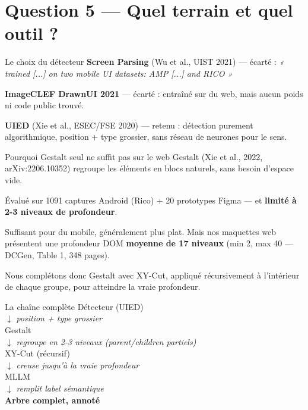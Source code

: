 \documentclass[11pt]{beamer}
\begin{document}
\section{Question 5 --- Quel terrain et quel outil ?}

\begin{frame}{Le choix du détecteur}
  \small
  \textbf{Screen Parsing} (Wu et al., UIST 2021) --- écarté :
  \textit{« trained [...] on two mobile UI datasets: AMP [...] and RICO »}

  \vspace{0.5em}
  \textbf{ImageCLEF DrawnUI 2021} --- écarté : entraîné sur du web, mais aucun
  poids ni code public trouvé.

  \vspace{0.5em}
  \textbf{UIED} (Xie et al., ESEC/FSE 2020) --- retenu : détection purement
  algorithmique, position + type grossier, sans réseau de neurones pour le sens.
\end{frame}

\begin{frame}{Pourquoi Gestalt seul ne suffit pas sur le web}
  Gestalt (Xie et al., 2022, arXiv:2206.10352) regroupe les éléments en blocs
  naturels, sans besoin d'espace vide.

  \vspace{1em}
  Évalué sur 1091 captures Android (Rico) + 20 prototypes Figma --- et
  \textbf{limité à 2-3 niveaux de profondeur}.

  \vspace{1em}
  Suffisant pour du mobile, généralement plus plat. Mais nos maquettes web
  présentent une profondeur DOM \textbf{moyenne de 17 niveaux} (min 2, max 40 ---
  DCGen, Table 1, 348 pages).

  \vspace{1em}
  \alert{Nous complétons donc Gestalt avec XY-Cut, appliqué récursivement à
  l'intérieur de chaque groupe, pour atteindre la vraie profondeur.}
\end{frame}

\begin{frame}{La chaîne complète}
  \centering
  Détecteur (UIED) \\
  $\downarrow$ \textit{position + type grossier} \\[0.3em]
  Gestalt \\
  $\downarrow$ \textit{regroupe en 2-3 niveaux (parent/children partiels)} \\[0.3em]
  XY-Cut (récursif) \\
  $\downarrow$ \textit{creuse jusqu'à la vraie profondeur} \\[0.3em]
  MLLM \\
  $\downarrow$ \textit{remplit label sémantique}\\[0.3em]
  \textbf{Arbre complet, annoté}
\end{frame}
\end{document}
